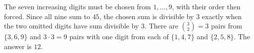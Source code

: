 The seven increasing digits must be chosen from $1,\ldots,9$, with their order then forced. Since all nine sum to $45$, the chosen sum is divisible by $3$ exactly when the two omitted digits have sum divisible by $3$. There are $\binom32=3$ pairs from $\{3,6,9\}$ and $3\cdot3=9$ pairs with one digit from each of $\{1,4,7\}$ and $\{2,5,8\}$. The answer is $\boxed{12}$.
